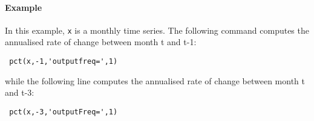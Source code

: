  \paragraph{Example}
 
 In this example, \texttt{x} is a monthly time series. The following
 command computes the annualised rate of change between month t and t-1:
 
 \begin{verbatim}
 pct(x,-1,'outputfreq=',1)
 \end{verbatim}
 
 while the following line computes the annualised rate of change between
 month t and t-3:
 
 \begin{verbatim}
 pct(x,-3,'outputFreq=',1)
 \end{verbatim}


